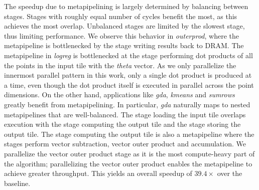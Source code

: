 The speedup due to metapipelining is largely determined by balancing between stages. Stages with roughly equal number of cycles benefit
the most, as this achieves the most overlap. Unbalanced stages are limited by the slowest stage, thus limiting performance.
We observe this behavior in \emph{outerprod},
where the metapipeline is bottlenecked by the stage writing results back to DRAM. The metapipeline in \emph{logreg} is bottlenecked
at the stage performing dot products of all the points in the input tile with the \emph{theta} vector. As we only parallelize the
innermost parallel pattern in this work, only a single dot product is produced at a time, even though the dot product itself
is executed in parallel across the point dimensions. On the other hand, applications
like \emph{gda}, \emph{kmeans} and \emph{sumrows} greatly benefit from metapipelining. In particular, \emph{gda} naturally
maps to nested metapipelines that are well-balanced. The stage loading the input tile overlaps execution with the stage
computing the output tile and the stage storing the output tile. The stage computing the output tile is also
a metapipeline where the stages perform vector subtraction, vector outer product and accumulation. We parallelize the vector
outer product stage as it is the most compute-heavy part of the algorithm; parallelizing the vector outer product enables
the metapipeline to achieve greater throughput. This yields an overall speedup of $39.4\times$
over the baseline.
